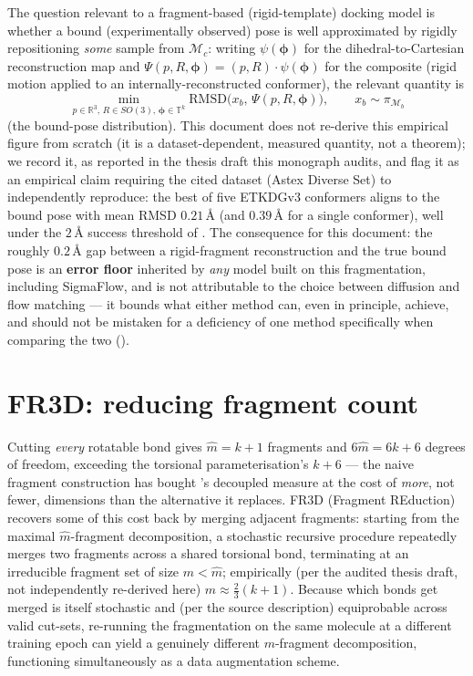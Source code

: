 \documentclass[11pt,a4paper]{report}
\theoremstyle{definition}
\theoremstyle{remark}
\newcommand{\RR}{\mathbb R}
\begin{document}
The question relevant to a fragment-based (rigid-template) docking model is
whether a bound (experimentally observed) pose is well approximated by
rigidly repositioning \emph{some} sample from $\mathcal M_c$: writing
$\psi(\bm\phi)$ for the dihedral-to-Cartesian reconstruction map and
$\Psi(p,R,\bm\phi)=(p,R)\cdot\psi(\bm\phi)$ for the composite (rigid motion
applied to an internally-reconstructed conformer), the relevant quantity is
\[
\min_{p\in\RR^3,\,R\in SO(3),\,\bm\phi\in\mathbb T^k}
\mathrm{RMSD}\bigl(x_b,\,\Psi(p,R,\bm\phi)\bigr),
\qquad
x_b\sim\pi_{\mathcal M_b}
\]
(the bound-pose distribution). This document does not re-derive this
empirical figure from scratch (it is a dataset-dependent, measured
quantity, not a theorem); we record it, as reported in the thesis draft
this monograph audits, and flag it as an empirical claim requiring the
cited dataset (Astex Diverse Set) to independently reproduce: the best of
five ETKDGv3 conformers aligns to the bound pose with mean RMSD
$0.21\,$\r A (and $0.39\,$\r A for a single conformer), well under the
$2\,$\r A success threshold of . The consequence for this
document: the roughly $0.2$\,\r A gap between a rigid-fragment
reconstruction and the true bound pose is an \textbf{error floor}
inherited by \emph{any} model built on this fragmentation, including
SigmaFlow, and is not attributable to the choice between diffusion and
flow matching --- it bounds what either method can, even in principle,
achieve, and should not be mistaken for a deficiency of one method
specifically when comparing the two ().

\section{FR3D: reducing fragment count}
\label{sec:sigmadock-fr3d}

Cutting \emph{every} rotatable bond gives $\hat m=k+1$ fragments and
$6\hat m=6k+6$ degrees of freedom, exceeding the torsional
parameterisation's $k+6$ --- the naive fragment construction has bought
's decoupled measure at the cost of
\emph{more}, not fewer, dimensions than the alternative it replaces. FR3D
(Fragment REduction) recovers some of this cost back by merging adjacent
fragments: starting from the maximal $\hat m$-fragment decomposition, a
stochastic recursive procedure repeatedly merges two fragments across a
shared torsional bond, terminating at an irreducible fragment set of size
$m<\hat m$; empirically (per the audited thesis draft, not independently
re-derived here) $m\approx\tfrac23(k+1)$. Because which bonds get merged is
itself stochastic and (per the source description) equiprobable across
valid cut-sets, re-running the fragmentation on the same molecule at a
different training epoch can yield a genuinely different $m$-fragment
decomposition, functioning simultaneously as a data augmentation scheme.
\end{document}
